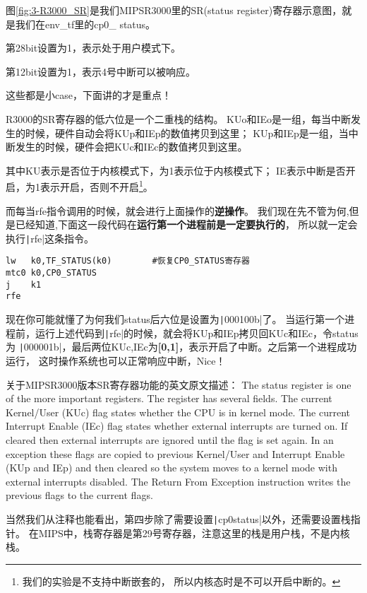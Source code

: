 图\ref{fig:3-R3000_SR}是我们MIPSR3000里的SR(status register)寄存器示意图，就是我们在env\_tf里的cp0\_ status。

第28bit设置为1，表示处于用户模式下。

第12bit设置为1，表示4号中断可以被响应。

这些都是小case，下面讲的才是重点！

R3000的SR寄存器的低六位是一个二重栈的结构。
KUo和IEo是一组，每当中断发生的时候，硬件自动会将KUp和IEp的数值拷贝到这里；
KUp和IEp是一组，当中断发生的时候，硬件会把KUc和IEc的数值拷贝到这里。

其中KU表示是否位于内核模式下，为1表示位于内核模式下；
IE表示中断是否开启，为1表示开启，否则不开启\footnote{我们的实验是不支持中断嵌套的，
所以内核态时是不可以开启中断的。}。

而每当rfe指令调用的时候，就会进行上面操作的\textbf{逆操作}。
我们现在先不管为何,但是已经知道,下面这一段代码在\textbf{运行第一个进程前是一定要执行的}，
\label{env_pop_tf}所以就一定会执行\texttt|rfe|这条指令。

\begin{verbatim}
lw   k0,TF_STATUS(k0)        #恢复CP0_STATUS寄存器    
mtc0 k0,CP0_STATUS
j    k1
rfe
\end{verbatim}

现在你可能就懂了为何我们status后六位是设置为\texttt|000100b|了。
当运行第一个进程前，运行上述代码到\texttt|rfe|的时候，就会将KUp和IEp拷贝回KUc和IEc，令status为 
\texttt|000001b|，最后两位KUc,IEc为\textbf{[0,1]}，表示开启了中断。之后第一个进程成功运行，
这时操作系统也可以正常响应中断，Nice！

\begin{note}
{\small 关于MIPSR3000版本SR寄存器功能的英文原文描述：
The status register is one of the more important registers. The register has several
fields. The current Kernel/User (KUc) flag states whether the CPU is in kernel mode.
The current Interrupt Enable (IEc) flag states whether external interrupts are turned on.
If cleared then external interrupts are ignored until the flag is set again. In an exception
these flags are copied to previous Kernel/User and Interrupt Enable (KUp and IEp) and
then cleared so the system moves to a kernel mode with external interrupts disabled.
The Return From Exception instruction writes the previous flags to the current flags.}
\end{note}

当然我们从注释也能看出，第四步除了需要设置\texttt|cp0status|以外，还需要设置栈指针。
在MIPS中，栈寄存器是第29号寄存器，注意这里的栈是用户栈，不是内核栈。

